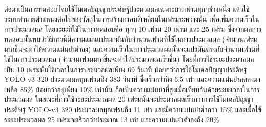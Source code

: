 ต่อมาเป็นการทดสอบโดยใช้โมเดลปัญญาประดิษฐ์ประมวลผลเฉพาะบางเฟรมทุกๆช่วงหนึ่ง แล้วใช้ระบบทำนายตำแหน่งต่อไปของวัตถุในการสร้างกรอบสี่เหลี่ยมในเฟรมระหว่างนั้น เพื่อเพิ่มความเร็วในการประมวลผล 
โดยระยะที่ใช้ในการทดสอบคือ ทุกๆ 10 เฟรม 20 เฟรม และ 25 เฟรม ซึ่งจากผลการทดสอบนั้นพบว่าวิธีการนี้มีความแม่นแปรผกผันกับจำนวนเฟรมที่ใช้ในการประมวลผล (จำนวนเฟรมมากขึ้นจะทำให้ความแม่นยำต่ำลง) 
และความเร็วในการประมวลผลนั้นจะแปรผันตรงกับจำนวนเฟรมที่ใช้ในการประมวลผล (จำนวนเฟรมมากขึ้นจะทำให้ประมวลผลเร็วขึ้น) โดยที่การใช้ระยะประมวลผลเป็น 10 เฟรมนั้นใช้เวลาในการประมวลผลเพียง 69 วินาที 
น้อยกว่าการใช้โมเดลปัญญาประดิษฐ์ YOLO-v3 320 ประมวลผลทุกเฟรมถึง 383 วินาที ซึ่งเร็วกว่าถึง 6.5 เท่า และความแม่นยำลดลงมาเหลือ 85\% น้อยกว่าอยู่เพียง 10\% เท่านั้น ถือเป็นความแม่นยำที่สูงเมื่อเทียบกันด้วยระยะเวลาในการประมวลผล
ในขณะที่การใช้ระยะประมวลผล 20 เฟรมนั้นจะประมวลผลเร็วกว่าการใช้โมเดลปัญญาประดิษฐ์ YOLO-v3 320 ประมวลผลทุกเฟรมถึง 11 เท่า และมีความแม่นยำต่ำกว่า 15\%
และเมื่อใช้ระยะประมวลผล 25 เฟรมจะเร็วกว่าประมาณ 13 เท่า และความแม่นยำต่ำลงถึง 20\% 